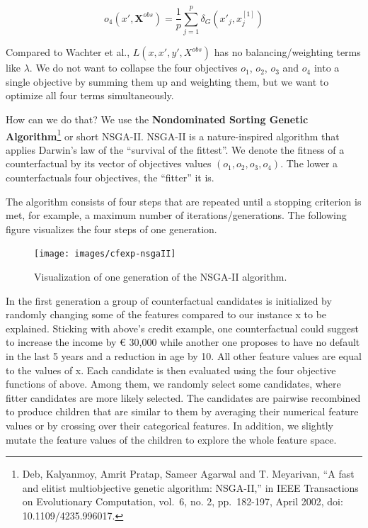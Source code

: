 \documentclass[12pt,]{krantz}
\newcommand{\euro}{€}
\begin{document}
\[o_4(x',\textbf{X}^{obs})=\frac{1}{p}\sum_{j=1}^{p}\delta_G(x'_j,x^{[1]}_j)\]

Compared to Wachter et al., \(L(x,x',y',X^{obs})\) has no
balancing/weighting terms like \(\lambda\). We do not want to collapse
the four objectives \(o_1\), \(o_2\), \(o_3\) and \(o_4\) into a single
objective by summing them up and weighting them, but we want to optimize
all four terms simultaneously.

How can we do that? We use the \textbf{Nondominated Sorting Genetic
Algorithm}\footnote{Deb, Kalyanmoy, Amrit Pratap, Sameer Agarwal and T.
  Meyarivan, ``A fast and elitist multiobjective genetic algorithm:
  NSGA-II,'' in IEEE Transactions on Evolutionary Computation, vol.~6,
  no. 2, pp.~182-197, April 2002, doi: 10.1109/4235.996017.} or short
NSGA-II. NSGA-II is a nature-inspired algorithm that applies Darwin's
law of the ``survival of the fittest''. We denote the fitness of a
counterfactual by its vector of objectives values \((o_1,o_2,o_3,o_4)\).
The lower a counterfactuals four objectives, the ``fitter'' it is.

The algorithm consists of four steps that are repeated until a stopping
criterion is met, for example, a maximum number of
iterations/generations. The following figure visualizes the four steps
of one generation.

\begin{figure}

{\centering \texttt{[image: images/cfexp-nsgaII]} 

}

\caption{Visualization of one generation of the NSGA-II algorithm.}\label{fig:nsgaII-cf}
\end{figure}

In the first generation a group of counterfactual candidates is
initialized by randomly changing some of the features compared to our
instance x to be explained. Sticking with above's credit example, one
counterfactual could suggest to increase the income by \euro{} 30,000
while another one proposes to have no default in the last 5 years and a
reduction in age by 10. All other feature values are equal to the values
of x. Each candidate is then evaluated using the four objective
functions of above. Among them, we randomly select some candidates,
where fitter candidates are more likely selected. The candidates are
pairwise recombined to produce children that are similar to them by
averaging their numerical feature values or by crossing over their
categorical features. In addition, we slightly mutate the feature values
of the children to explore the whole feature space.
\end{document}
